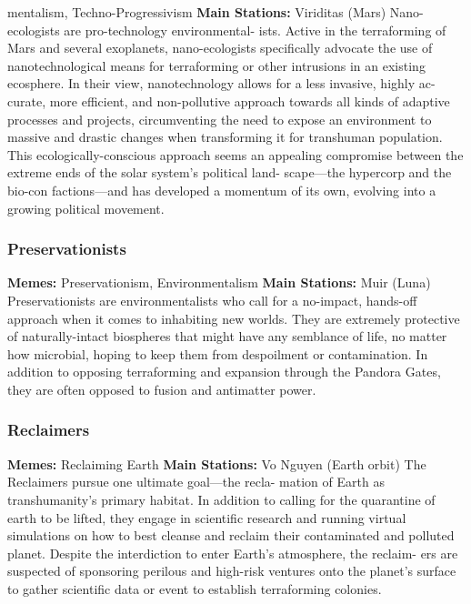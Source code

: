 mentalism, Techno-Progressivism
\textbf{Main Stations:} Viriditas (Mars)
Nano-ecologists are pro-technology environmental-
ists. Active in the terraforming of Mars and several 
exoplanets, nano-ecologists specifically advocate the 
use of nanotechnological means for terraforming or 
other intrusions in an existing ecosphere. In their view, 
nanotechnology allows for a less invasive, highly ac-
curate, more efficient, and non-pollutive approach 
towards all kinds of adaptive processes and projects, 
circumventing the need to expose an environment to 
massive and drastic changes when transforming it for 
transhuman population. This ecologically-conscious 
approach seems an appealing compromise between 
the extreme ends of the solar system's political land-
scape—the hypercorp and the bio-con factions—and 
has developed a momentum of its own, evolving into 
a growing political movement.

\subsubsection{Preservationists}

\textbf{Memes:} Preservationism, Environmentalism
\textbf{Main Stations:} Muir (Luna)
Preservationists are environmentalists who call for 
a no-impact, hands-off approach when it comes to 
inhabiting new worlds. They are extremely protective 
of naturally-intact biospheres that might have any 
semblance of life, no matter how microbial, hoping 
to keep them from despoilment or contamination. 
In addition to opposing terraforming and expansion 
through the Pandora Gates, they are often opposed to 
fusion and antimatter power.

\subsubsection{Reclaimers}

\textbf{Memes:} Reclaiming Earth
\textbf{Main Stations:} Vo Nguyen (Earth orbit)
The Reclaimers pursue one ultimate goal—the recla-
mation of Earth as transhumanity's primary habitat. 
In addition to calling for the quarantine of earth to be 
lifted, they engage in scientific research and running 
virtual simulations on how to best cleanse and reclaim 
their contaminated and polluted planet. Despite the 
interdiction to enter Earth's atmosphere, the reclaim-
ers are suspected of sponsoring perilous and high-risk 
ventures onto the planet's surface to gather scientific 
data or event to establish terraforming colonies.

